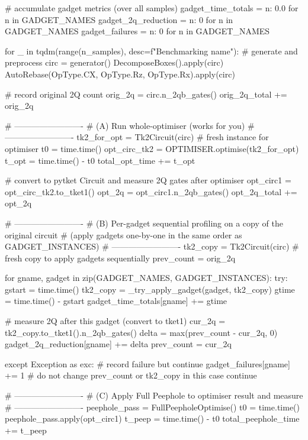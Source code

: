     # accumulate gadget metrics (over all samples)
    gadget_time_totals = {n: 0.0 for n in GADGET_NAMES}
    gadget_2q_reduction = {n: 0 for n in GADGET_NAMES}
    gadget_failures = {n: 0 for n in GADGET_NAMES}

    for _ in tqdm(range(n_samples), desc=f"Benchmarking {name}"):
        # generate and preprocess
        circ = generator()
        DecomposeBoxes().apply(circ)
        AutoRebase({OpType.CX, OpType.Rz, OpType.Rx}).apply(circ)

        # record original 2Q count
        orig_2q = circ.n_2qb_gates()
        orig_2q_total += orig_2q

        # -------------------------
        # (A) Run whole-optimiser (works for you)
        # -------------------------
        tk2_for_opt = Tk2Circuit(circ)  # fresh instance for optimiser
        t0 = time.time()
        opt_circ_tk2 = OPTIMISER.optimise(tk2_for_opt)
        t_opt = time.time() - t0
        total_opt_time += t_opt

        # convert to pytket Circuit and measure 2Q gates after optimiser
        opt_circ1 = opt_circ_tk2.to_tket1()
        opt_2q = opt_circ1.n_2qb_gates()
        opt_2q_total += opt_2q

        # -------------------------
        # (B) Per-gadget sequential profiling on a copy of the original circuit
        #     (apply gadgets one-by-one in the same order as GADGET_INSTANCES)
        # -------------------------
        tk2_copy = Tk2Circuit(circ)  # fresh copy to apply gadgets sequentially
        prev_count = orig_2q

        for gname, gadget in zip(GADGET_NAMES, GADGET_INSTANCES):
            try:
                gstart = time.time()
                tk2_copy = _try_apply_gadget(gadget, tk2_copy)
                gtime = time.time() - gstart
                gadget_time_totals[gname] += gtime

                # measure 2Q after this gadget (convert to tket1)
                cur_2q = tk2_copy.to_tket1().n_2qb_gates()
                delta = max(prev_count - cur_2q, 0)
                gadget_2q_reduction[gname] += delta
                prev_count = cur_2q

            except Exception as exc:
                # record failure but continue
                gadget_failures[gname] += 1
                # do not change prev_count or tk2_copy in this case
                continue

        # -------------------------
        # (C) Apply Full Peephole to optimiser result and measure
        # -------------------------
        peephole_pass = FullPeepholeOptimise()
        t0 = time.time()
        peephole_pass.apply(opt_circ1)
        t_peep = time.time() - t0
        total_peephole_time += t_peep

